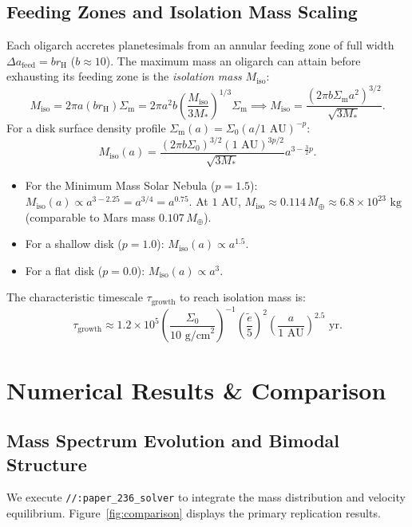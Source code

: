 \documentclass[11pt,a4paper]{article}
\begin{document}
\subsection{Feeding Zones and Isolation Mass Scaling}
Each oligarch accretes planetesimals from an annular feeding zone of full width $\Delta a_{\text{feed}} = b r_{\text{H}}$ ($b \approx 10$). The maximum mass an oligarch can attain before exhausting its feeding zone is the \textit{isolation mass} $M_{\text{iso}}$:
\begin{equation}
M_{\text{iso}} = 2 \pi a (b r_{\text{H}}) \Sigma_{\text{m}} = 2 \pi a^2 b \left( \frac{M_{\text{iso}}}{3 M_*} \right)^{1/3} \Sigma_{\text{m}} \implies M_{\text{iso}} = \frac{(2 \pi b \Sigma_{\text{m}} a^2)^{3/2}}{\sqrt{3 M_*}}.
\end{equation}
For a disk surface density profile $\Sigma_{\text{m}}(a) = \Sigma_0 (a / 1\text{ AU})^{-p}$:
\begin{equation}
M_{\text{iso}}(a) = \frac{(2 \pi b \Sigma_0)^{3/2} (1\text{ AU})^{3p/2}}{\sqrt{3 M_*}} a^{3 - \frac{3}{2}p}.
\end{equation}
\begin{itemize}
    \item For the Minimum Mass Solar Nebula ($p = 1.5$): $M_{\text{iso}}(a) \propto a^{3 - 2.25} = a^{3/4} = a^{0.75}$. At $1\text{ AU}$, $M_{\text{iso}} \approx 0.114\,M_\oplus \approx 6.8 \times 10^{23}\text{ kg}$ (comparable to Mars mass $0.107\,M_\oplus$).
    \item For a shallow disk ($p = 1.0$): $M_{\text{iso}}(a) \propto a^{1.5}$.
    \item For a flat disk ($p = 0.0$): $M_{\text{iso}}(a) \propto a^3$.
\end{itemize}

The characteristic timescale $\tau_{\text{growth}}$ to reach isolation mass is:
\begin{equation}
\tau_{\text{growth}} \approx 1.2 \times 10^5 \left( \frac{\Sigma_0}{10\text{ g/cm}^2} \right)^{-1} \left( \frac{\tilde{e}}{5} \right)^2 \left( \frac{a}{1\text{ AU}} \right)^{2.5}\text{ yr}.
\end{equation}

\section{Numerical Results \& Comparison}

\subsection{Mass Spectrum Evolution and Bimodal Structure}
We execute \texttt{//:paper\_236\_solver} to integrate the mass distribution and velocity equilibrium. Figure~\ref{fig:comparison} displays the primary replication results.
\end{document}
